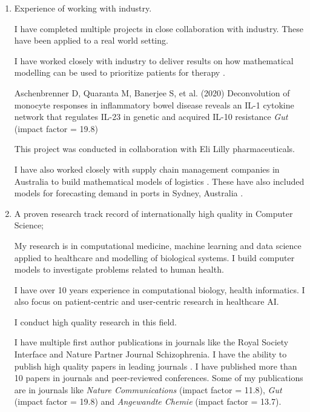 \documentclass[10pt]{article}
\begin{document}
\begin{enumerate}

\item Experience of working with industry.

I have completed multiple projects in close collaboration with industry. These have been applied to a real world setting.


I have worked closely with industry to deliver results on how mathematical modelling can be used to prioritize patients for therapy \cite{Aschenbrenner2020}. 

Aschenbrenner D, Quaranta M, Banerjee S,  et al. (2020) Deconvolution of monocyte responses in inflammatory bowel disease reveals an IL-1 cytokine network that regulates IL-23 in genetic and acquired IL-10 resistance \textit{Gut} (impact factor = 19.8)

This project was conducted in collaboration with Eli Lilly pharmaceuticals.

I have also worked closely with supply chain management companies in Australia to build mathematical models of logistics \cite{Banerjee2016b}\cite{Garcia-Flores2016a}\cite{Tyshetskiy2016}. These have also included models for forecasting demand in ports in Sydney, Australia \cite{Tyshetskiy2016}.


\item A proven research track record of internationally high quality in Computer Science;

My research is in computational medicine, machine learning and data science applied to healthcare and modelling of biological systems. I build computer models to investigate problems related to human health.

I have over 10 years experience in computational biology, health informatics. I also focus on patient-centric and user-centric research in healthcare AI. 

I conduct high quality research in this field. 


I have multiple first author publications in journals like the Royal Society Interface and Nature Partner Journal Schizophrenia. I have the ability to publish high quality papers in leading journals \cite{Banerjee2022b,Banerjee2021e,Banerjee2018d,Banerjee2017g,Banerjee2016,Liu2014a,Mallick2019,Graessl2017,Banerjee2020d,Aschenbrenner2020}. I have published more than 10 papers in journals and peer-reviewed conferences. Some of my publications are in journals like \textit{Nature Communications} (impact factor = 11.8), \textit{Gut} (impact factor = 19.8) and \textit{Angewandte Chemie} (impact factor = 13.7). 



\end{enumerate}
\end{document}
